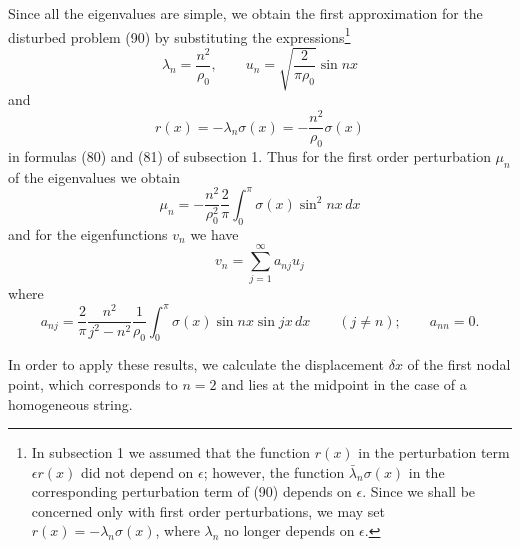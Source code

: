 Since all the eigenvalues are simple, we obtain the first approximation for the disturbed problem (90) by substituting the expressions\footnote{In subsection 1 we assumed that the function $r(x)$ in the perturbation term $\epsilon r(x)$ did not depend on $\epsilon$; however, the function $\bar\lambda_n\sigma(x)$ in the corresponding perturbation term of (90) depends on $\epsilon$. Since we shall be concerned only with first order perturbations, we may set $r(x)=-\lambda_n\sigma(x)$, where $\lambda_n$ no longer depends on $\epsilon$.}
\[
\lambda_n=\frac{n^2}{\rho_0},\qquad u_n=\sqrt{\frac2{\pi\rho_0}}\sin nx
\]
and
\[
r(x)=-\lambda_n\sigma(x)=-\frac{n^2}{\rho_0}\sigma(x)
\]
in formulas (80) and (81) of subsection 1. Thus for the first order perturbation $\mu_n$ of the eigenvalues we obtain
\[
\mu_n=-\frac{n^2}{\rho_0^2}\frac2\pi\int_0^\pi\sigma(x)\sin^2nx\,dx
\]
and for the eigenfunctions $v_n$ we have
\begin{equation}
v_n=\sum_{j=1}^{\infty}a_{nj}u_j
\tag{91}
\end{equation}
where
\begin{equation}
a_{nj}=\frac2\pi\frac{n^2}{j^2-n^2}\frac1{\rho_0}\int_0^\pi\sigma(x)\sin nx\sin jx\,dx\qquad(j\ne n);\qquad a_{nn}=0.
\tag{92}
\end{equation}

In order to apply these results, we calculate the displacement $\delta x$ of the first nodal point, which corresponds to $n=2$ and lies at the midpoint in the case of a homogeneous string.

